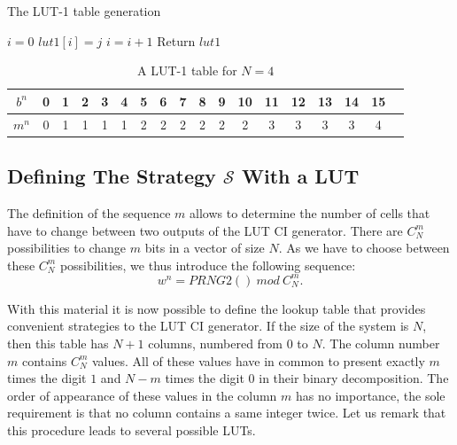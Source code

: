 \begin{algorithm}
\caption{The LUT-1 table generation}\label{LUT1 creation}
\begin{algorithmic}[1]
\STATE $i=0$
             \STATE $lut1[i]=j$
             \STATE $i = i + 1$
         \ENDWHILE
    \ENDFOR
\STATE Return $lut1$
\end{algorithmic}
\end{algorithm}

\begin{table} 
\renewcommand{\arraystretch}{1.3}
\caption{A LUT-1 table for $N=4$}
\label{LUT1 for example}
\centering
  \begin{tabular}{|c|c|c|c|c|c|c|c|c|c|c|c|c|c|c|c|c|c|}
    \hline
 $b^n$  & 0 & 1 & 2 & 3 & 4 & 5 & 6 & 7 &8 &9 &10 &11 &12 &13 &14 &15\\ \hline\hline
 $m^n$ & 0 & 1 & 1 & 1 & 1 & 2 & 2 & 2 & 2 & 2 & 2 & 3 & 3 &3 & 3 &4 \\ \hline

  \end{tabular}
\end{table}


\subsection{Defining The Strategy $\mathcal{S}$ With a LUT}
\label {LUT2}
The definition of the sequence $m$ allows to determine the number of cells 
that have to change between two outputs of the LUT CI generator.
There are $C_N^m$ possibilities to change $m$ bits in a vector of size $N$.
As we have to choose between these $C_N^m$ possibilities, we thus introduce the following sequence:
\begin{equation}
w^n=PRNG2()~mod~C^m_N.
\end{equation}

With this material it is now possible to define the lookup table that provides convenient strategies to the LUT CI generator.
If the size of the system is $N$, then this table has $N+1$ columns, numbered from $0$ to $N$.
The column number $m$ contains $C_N^m$ values.
All of these values have in common to present exactly $m$ times the digit $1$ 
and $N-m$ times the digit $0$ in their binary decomposition.
The order of appearance of these values in the column $m$ has no importance, 
the sole requirement is that no column contains a same integer twice.
Let us remark that this procedure leads to several possible LUTs.

